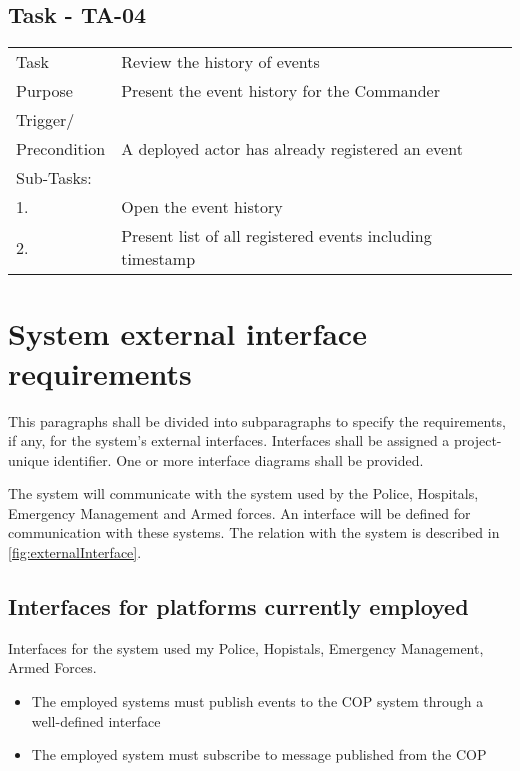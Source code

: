 \FloatBarrier
\newpage


\subsection{Task - TA-04}

\begin{longtable}{| p{2.5cm}  | p{10cm} |  }
	\hline
	Task & Review the history of events \\
	Purpose & Present the event history for the Commander \\
	Trigger/ &  \\ Precondition & A deployed actor has already registered an event \\
	\hline
	Sub-Tasks: & \\
	1. & Open the event history \\
	2. & Present list of all registered events including timestamp  \\
	\hline
\end{longtable}

\section{System external interface requirements}
This paragraphs shall be divided into subparagraphs to specify the requirements, if any, for the system’s external interfaces. Interfaces shall be assigned a project-unique identifier. One or more interface diagrams shall be provided.

The system will communicate with the system used by the Police, Hospitals, Emergency Management and Armed forces. An interface will be defined for communication with these systems. The relation with the system is described in \ref{fig:externalInterface}.


\subsection{Interfaces for platforms currently employed}
Interfaces for the system used my Police, Hopistals, Emergency Management, Armed Forces.
\begin{itemize}
	\item The employed systems must publish events to the COP system through a well-defined interface
	\item The employed system must  subscribe to message published from the COP
\end{itemize}

